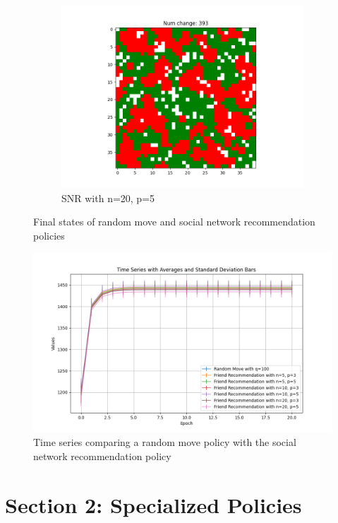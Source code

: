 \documentclass[11pt]{article}
\begin{document}
\begin{figure}[h]
\begin{subfigure}{0.14\textwidth}
			\includegraphics[width=\linewidth]{final_social_n20p5.png}
			\caption{\centering SNR with n=20, p=5}
		\end{subfigure}
		\caption{Final states of random move and social network recommendation policies}
	\end{figure}
	\vspace{-1em} %
	\begin{figure}[h]
		\centering
		\includegraphics[width=\textwidth]{policies01.png}
		\caption{Time series comparing a random move policy with the social network recommendation policy}
	\end{figure}
	\FloatBarrier

	\newpage
	\section{Section 2: Specialized Policies}
\end{document}
